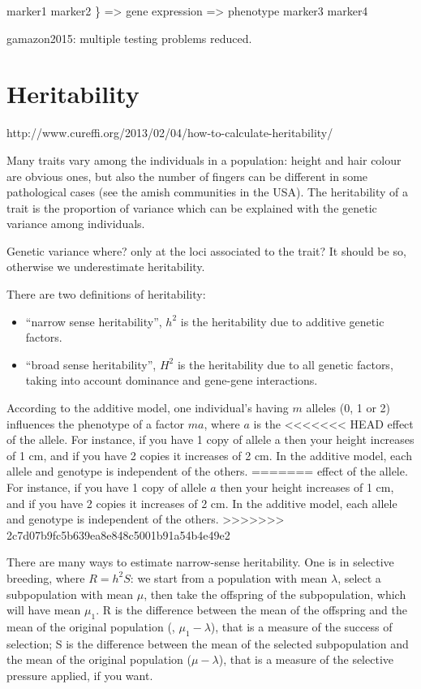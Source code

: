 \documentclass[../main.tex]{subfiles}
\begin{document}
marker1
marker2
			\} => gene expression => phenotype
marker3
marker4

gamazon2015: multiple testing problems reduced.

\section{Heritability}

http://www.cureffi.org/2013/02/04/how-to-calculate-heritability/

Many traits vary among the individuals in a population: height and hair 
colour are obvious ones, but also the number of fingers can be different 
in some pathological cases (see the amish communities in the USA). The 
heritability of a trait is the proportion of variance which can be 
explained with the genetic variance among individuals.

Genetic variance where? only at the loci associated to the trait? It 
should be so, otherwise we underestimate heritability.

There are two definitions of heritability:

\begin{itemize}
	\item \enquote{narrow sense heritability}, $h^2$ is the heritability 
		due to additive genetic factors.
	\item \enquote{broad sense heritability}, $H^2$ is the heritability 
		due to all genetic factors, taking into account dominance and 
		gene-gene interactions.
\end{itemize}

According to the additive model, one individual's having $m$ alleles (0, 
1 or 2) influences the phenotype of a factor $m a$, where $a$ is the 
<<<<<<< HEAD
  effect of the allele. For instance, if you have 1 copy of allele a 
then your height increases of 1 cm, and if you have 2 copies it 
increases of 2 cm. In the additive model, each allele and genotype is 
independent of the others.
=======
  effect of the allele. For instance, if you have 1 copy of allele $a$ 
  then your height increases of 1 cm, and if you have 2 copies it 
  increases of 2 cm. In the additive model, each allele and genotype is 
  independent of the others.
>>>>>>> 2c7d07b9fc5b639ea8e848c5001b91a54b4e49e2

There are many ways to estimate narrow-sense heritability. One is in 
selective breeding, where $R = h^2 S$: we start from a population with 
mean $\lambda$, select a subpopulation with mean $\mu$, then take the 
offspring of the subpopulation, which will have mean $\mu_1$. R is the 
difference between the mean of the offspring and the mean of the 
original population (\ie, $\mu_1 - \lambda$), that is a measure of the 
success of selection; S is the difference between the mean of the 
selected subpopulation and the mean of the original population (\ie $\mu 
- \lambda$), that is a measure of the selective pressure applied, if you 
want.
\end{document}
